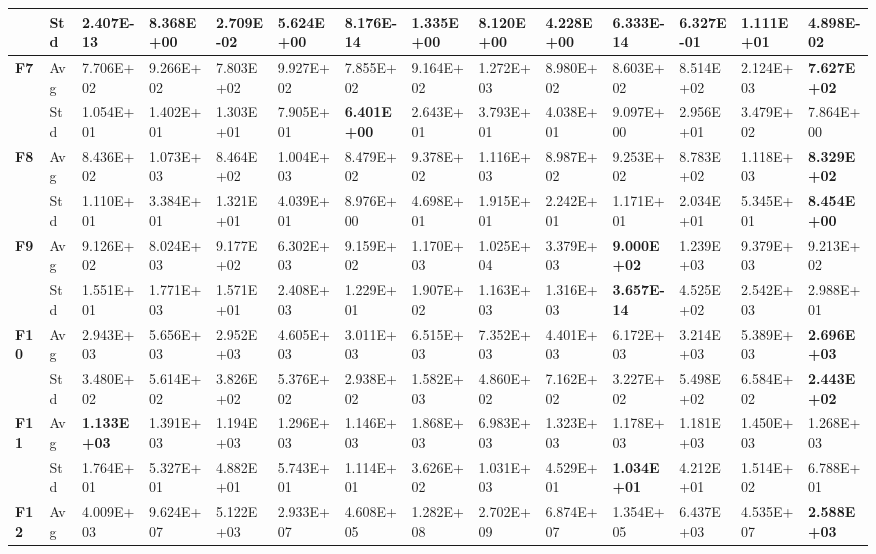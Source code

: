 \documentclass{article} %
\begin{document}
\begin{tabular}{|p{0.2in}|p{0.2in}|p{0.4in}|p{0.4in}|p{0.4in}|p{0.4in}|p{0.4in}|p{0.4in}|p{0.4in}|p{0.4in}|p{0.4in}|p{0.4in}|p{0.4in}|p{0.4in}|}
\textbf{} & Std & 2.407E-13 & 8.368E+00 & 2.709E-02 & 5.624E+00 & 8.176E-14 & 1.335E+00 & 8.120E+00 & 4.228E+00 & \textbf{6.333E-14} & 6.327E-01 & 1.111E+01 & 4.898E-02 \\ \hline 
\textbf{F7} & Avg & 7.706E+02 & 9.266E+02 & 7.803E+02 & 9.927E+02 & 7.855E+02 & 9.164E+02 & 1.272E+03 & 8.980E+02 & 8.603E+02 & 8.514E+02 & 2.124E+03 & \textbf{7.627E+02} \\ \hline 
\textbf{} & Std & 1.054E+01 & 1.402E+01 & 1.303E+01 & 7.905E+01 & \textbf{6.401E+00} & 2.643E+01 & 3.793E+01 & 4.038E+01 & 9.097E+00 & 2.956E+01 & 3.479E+02 & 7.864E+00 \\ \hline 
\textbf{F8} & Avg & 8.436E+02 & 1.073E+03 & 8.464E+02 & 1.004E+03 & 8.479E+02 & 9.378E+02 & 1.116E+03 & 8.987E+02 & 9.253E+02 & 8.783E+02 & 1.118E+03 & \textbf{8.329E+02} \\ \hline 
\textbf{} & Std & 1.110E+01 & 3.384E+01 & 1.321E+01 & 4.039E+01 & 8.976E+00 & 4.698E+01 & 1.915E+01 & 2.242E+01 & 1.171E+01 & 2.034E+01 & 5.345E+01 & \textbf{8.454E+00} \\ \hline 
\textbf{F9} & Avg & 9.126E+02 & 8.024E+03 & 9.177E+02 & 6.302E+03 & 9.159E+02 & 1.170E+03 & 1.025E+04 & 3.379E+03 & \textbf{9.000E+02} & 1.239E+03 & 9.379E+03 & 9.213E+02 \\ \hline 
\textbf{} & Std & 1.551E+01 & 1.771E+03 & 1.571E+01 & 2.408E+03 & 1.229E+01 & 1.907E+02 & 1.163E+03 & 1.316E+03 & \textbf{3.657E-14} & 4.525E+02 & 2.542E+03 & 2.988E+01 \\ \hline 
\textbf{F10} & Avg & 2.943E+03 & 5.656E+03 & 2.952E+03 & 4.605E+03 & 3.011E+03 & 6.515E+03 & 7.352E+03 & 4.401E+03 & 6.172E+03 & 3.214E+03 & 5.389E+03 & \textbf{2.696E+03} \\ \hline 
\textbf{} & Std & 3.480E+02 & 5.614E+02 & 3.826E+02 & 5.376E+02 & 2.938E+02 & 1.582E+03 & 4.860E+02 & 7.162E+02 & 3.227E+02 & 5.498E+02 & 6.584E+02 & \textbf{2.443E+02} \\ \hline 
\textbf{F11} & Avg & \textbf{1.133E+03} & 1.391E+03 & 1.194E+03 & 1.296E+03 & 1.146E+03 & 1.868E+03 & 6.983E+03 & 1.323E+03 & 1.178E+03 & 1.181E+03 & 1.450E+03 & 1.268E+03 \\ \hline 
\textbf{} & Std & 1.764E+01 & 5.327E+01 & 4.882E+01 & 5.743E+01 & 1.114E+01 & 3.626E+02 & 1.031E+03 & 4.529E+01 & \textbf{1.034E+01} & 4.212E+01 & 1.514E+02 & 6.788E+01 \\ \hline 
\textbf{F12} & Avg & 4.009E+03 & 9.624E+07 & 5.122E+03 & 2.933E+07 & 4.608E+05 & 1.282E+08 & 2.702E+09 & 6.874E+07 & 1.354E+05 & 6.437E+03 & 4.535E+07 & \textbf{2.588E+03} \\ \hline 

\end{tabular}
\end{document}
